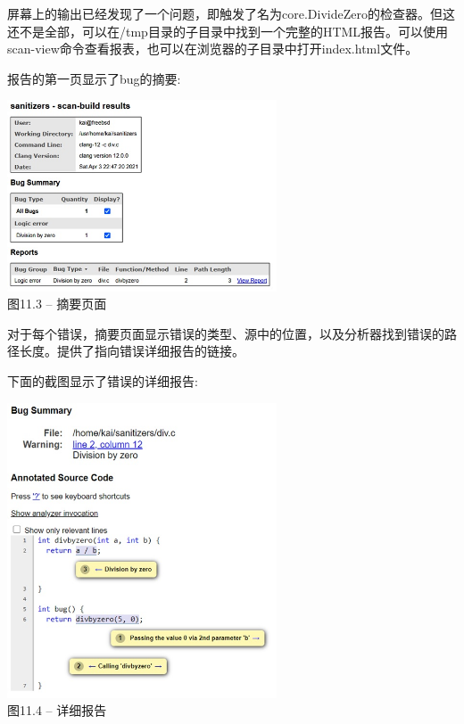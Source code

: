 屏幕上的输出已经发现了一个问题，即触发了名为core.DivideZero的检查器。但这还不是全部，可以在/tmp目录的子目录中找到一个完整的HTML报告。可以使用scan-view命令查看报表，也可以在浏览器的子目录中打开index.html文件。\par

报告的第一页显示了bug的摘要:\par

\hspace*{\fill} \par %
\begin{center}
\includegraphics[width=0.6\textwidth]{content/3/chapter11/images/3.jpg}\\
图11.3 – 摘要页面
\end{center}

对于每个错误，摘要页面显示错误的类型、源中的位置，以及分析器找到错误的路径长度。提供了指向错误详细报告的链接。\par

下面的截图显示了错误的详细报告:\par


\hspace*{\fill} \par %
\begin{center}
\includegraphics[width=0.6\textwidth]{content/3/chapter11/images/4.jpg}\\
图11.4 – 详细报告
\end{center}

